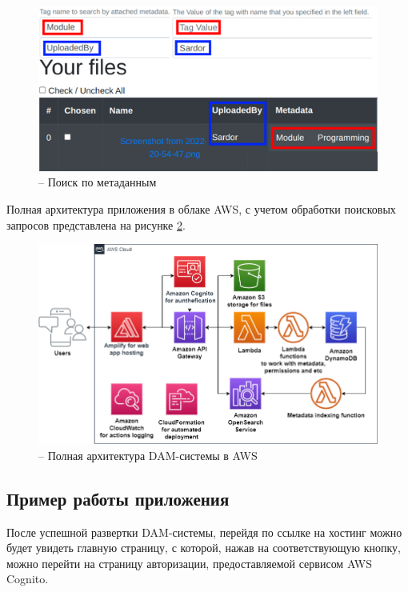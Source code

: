 \begin{figure}[H]
    \centering
    \includegraphics[scale=0.35]{images/ui/4_SearchExample.png}
    \caption{-- Поиск по метаданным}
    \label{searchExample}
\end{figure}

Полная архитектура приложения в облаке AWS, с учетом обработки поисковых запросов представлена на рисунке \ref{fullAwsArch}.

\begin{figure}[H]
    \centering
    \includegraphics[scale=0.55]{images/fullArch.png}
    \caption{-- Полная архитектура DAM-системы в AWS}
    \label{fullAwsArch}
\end{figure}

\subsection{Пример работы приложения}

После успешной развертки DAM-системы, перейдя по ссылке на хостинг можно будет увидеть главную страницу, с которой, нажав на соответствующую кнопку, можно перейти на страницу авторизации, предоставляемой сервисом AWS Cognito. 

